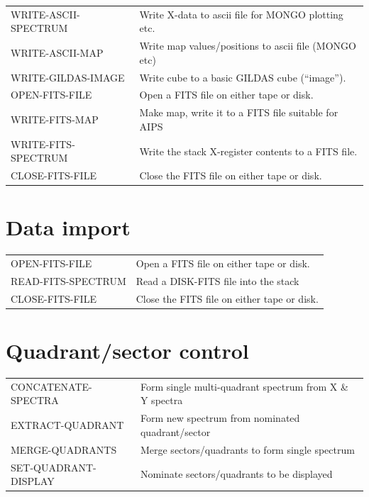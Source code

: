 \documentclass[11pt,twoside]{report}
\begin{document}
\begin{tabular}{ll}
WRITE-ASCII-SPECTRUM   & Write X-data to ascii file for MONGO plotting etc.\\
WRITE-ASCII-MAP        & Write map values/positions to ascii file (MONGO etc)\\
WRITE-GILDAS-IMAGE     & Write cube to a basic GILDAS cube (``image'').\\
OPEN-FITS-FILE         & Open a FITS file on either tape or disk.\\
WRITE-FITS-MAP         & Make map, write it to a FITS file suitable for AIPS\\
WRITE-FITS-SPECTRUM    & Write the stack X-register contents to a FITS file.\\
CLOSE-FITS-FILE & Close the FITS file on either tape or disk.\\
\end{tabular}

\section{Data import}
\begin{tabular}{ll}
OPEN-FITS-FILE         & Open a FITS file on either tape or disk.\\
READ-FITS-SPECTRUM     & Read a DISK-FITS file into the stack\\
CLOSE-FITS-FILE        & Close the FITS file on either tape or disk.\\
\end{tabular}

\section{Quadrant/sector control} 

\begin{tabular}{ll}
CONCATENATE-SPECTRA  & Form single multi-quadrant spectrum from X \& Y spectra\\
EXTRACT-QUADRANT     & Form new spectrum from nominated quadrant/sector\\
MERGE-QUADRANTS      & Merge sectors/quadrants to form single spectrum\\
SET-QUADRANT-DISPLAY & Nominate sectors/quadrants to be displayed\\
\end{tabular}
\end{document}
